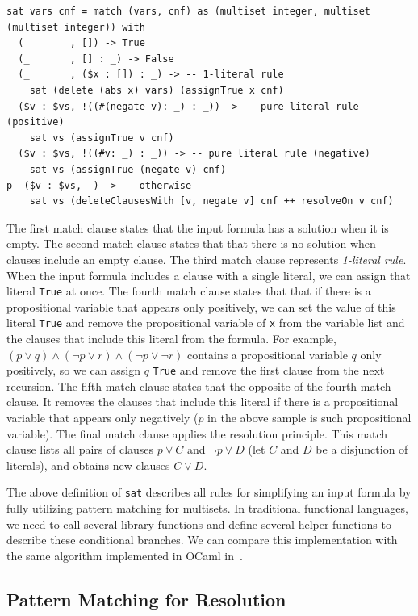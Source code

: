 \begin{lstlisting}[language=egison]
sat vars cnf = match (vars, cnf) as (multiset integer, multiset (multiset integer)) with
  (_       , []) -> True
  (_       , [] : _) -> False
  (_       , ($x : []) : _) -> -- 1-literal rule
    sat (delete (abs x) vars) (assignTrue x cnf)
  ($v : $vs, !((#(negate v): _) : _)) -> -- pure literal rule (positive)
    sat vs (assignTrue v cnf)
  ($v : $vs, !((#v: _) : _)) -> -- pure literal rule (negative)
    sat vs (assignTrue (negate v) cnf)
p  ($v : $vs, _) -> -- otherwise
    sat vs (deleteClausesWith [v, negate v] cnf ++ resolveOn v cnf)
\end{lstlisting}

The first match clause states that the input formula has a solution when it is empty.
The second match clause states that that there is no solution when clauses include an empty clause.
The third match clause represents \emph{1-literal rule}.
When the input formula includes a clause with a single literal, we can assign that literal \lstinline{True} at once.
The fourth match clause states that that if there is a propositional variable that appears only positively, we can set the value of this literal \lstinline{True} and remove the propositional variable of \lstinline{x} from the variable list and the clauses that include this literal from the formula.
For example, $(p \lor q) \wedge (\neg p \lor r) \wedge (\neg p \lor \neg r)$ contains a propositional variable $q$ only positively, so we can assign $q$ \lstinline{True} and remove the first clause from the next recursion.
The fifth match clause states that the opposite of the fourth match clause.
It removes the clauses that include this literal if there is a propositional variable that appears only negatively ($p$ in the above sample is such propositional variable).
The final match clause applies the resolution principle.
This match clause lists all pairs of clauses $p \lor C$ and $\neg p \lor D$ (let $C$ and $D$ be a disjunction of literals), and obtains new clauses $C \lor D$.

The above definition of \lstinline{sat} describes all rules for simplifying an input formula by fully utilizing pattern matching for multisets.
In traditional functional languages, we need to call several library functions and define several helper functions to describe these conditional branches.
We can compare this implementation with the same algorithm implemented in OCaml in~\cite{harrison2009handbook}.

\subsection{Pattern Matching for Resolution}

